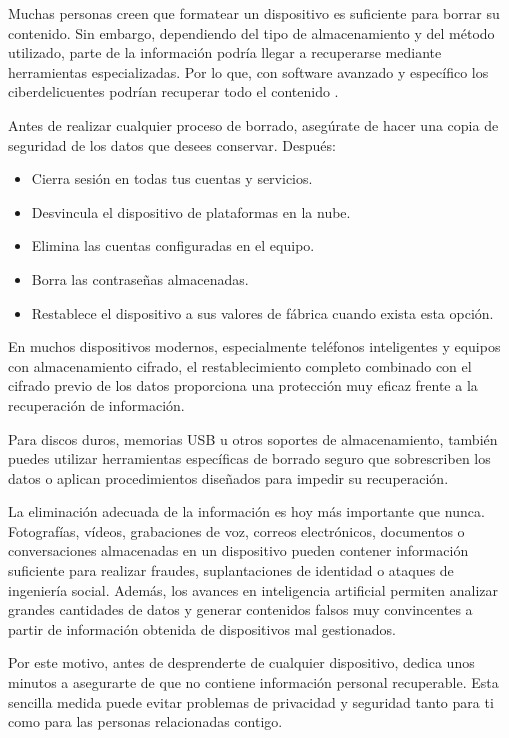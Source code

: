 \documentclass[
  spanish,
  a4paper,
  openany]{book}
\begin{document}
Muchas personas creen que formatear un dispositivo es suficiente para borrar su contenido. Sin embargo, dependiendo del tipo de almacenamiento y del método utilizado, parte de la información podría llegar a recuperarse mediante herramientas especializadas. Por lo que, con software avanzado y específico los ciberdelicuentes podrían recuperar todo el contenido \citep{ATICO34-borrado-seguro-de-datos}.

Antes de realizar cualquier proceso de borrado, asegúrate de hacer una copia de seguridad de los datos que desees conservar. Después:

\begin{itemize}
\item
  Cierra sesión en todas tus cuentas y servicios.
\item
  Desvincula el dispositivo de plataformas en la nube.
\item
  Elimina las cuentas configuradas en el equipo.
\item
  Borra las contraseñas almacenadas.
\item
  Restablece el dispositivo a sus valores de fábrica cuando exista esta opción.
\end{itemize}

En muchos dispositivos modernos, especialmente teléfonos inteligentes y equipos con almacenamiento cifrado, el restablecimiento completo combinado con el cifrado previo de los datos proporciona una protección muy eficaz frente a la recuperación de información.

Para discos duros, memorias USB u otros soportes de almacenamiento, también puedes utilizar herramientas específicas de borrado seguro que sobrescriben los datos o aplican procedimientos diseñados para impedir su recuperación.

La eliminación adecuada de la información es hoy más importante que nunca. Fotografías, vídeos, grabaciones de voz, correos electrónicos, documentos o conversaciones almacenadas en un dispositivo pueden contener información suficiente para realizar fraudes, suplantaciones de identidad o ataques de ingeniería social. Además, los avances en inteligencia artificial permiten analizar grandes cantidades de datos y generar contenidos falsos muy convincentes a partir de información obtenida de dispositivos mal gestionados.

Por este motivo, antes de desprenderte de cualquier dispositivo, dedica unos minutos a asegurarte de que no contiene información personal recuperable. Esta sencilla medida puede evitar problemas de privacidad y seguridad tanto para ti como para las personas relacionadas contigo.
\end{document}
